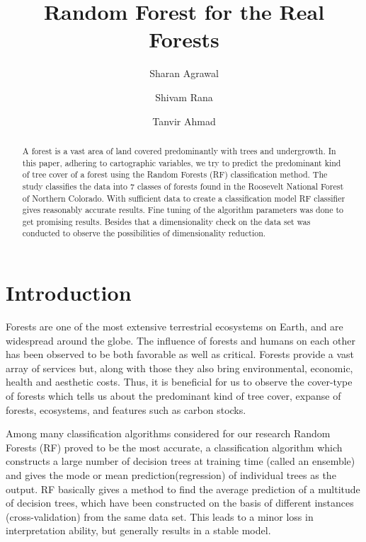\documentclass{llncs}
\begin{document}
\mainmatter
\title{Random Forest for the Real Forests}
\author{Sharan Agrawal \and Shivam Rana \and Tanvir Ahmad}



\maketitle

\begin{abstract}
A forest is a vast area of land covered predominantly with trees and undergrowth. In this paper, adhering to cartographic variables, we try to predict the predominant kind of tree cover of a forest using the Random Forests (RF) classification method. The study classifies the data into 7 classes of forests found in the Roosevelt National Forest of Northern Colorado. With sufficient data to create a classification model RF classifier gives reasonably accurate results. Fine tuning of the algorithm parameters was done to get promising results. Besides that a dimensionality check on the data set was conducted to observe the possibilities of dimensionality reduction.
\end{abstract}


\section{Introduction}

Forests are one of the most extensive terrestrial ecosystems on Earth, and are widespread around the globe. The influence of forests and humans on each other has been observed to be both favorable as well as critical. Forests provide a vast array of services but, along with those they also bring environmental, economic, health and aesthetic costs. Thus, it is beneficial for us to observe the cover-type of forests which tells us about the predominant kind of tree cover, expanse of forests, ecosystems, and features such as carbon stocks.

Among many classification algorithms considered for our research Random Forests (RF) proved to be the most accurate, a classification algorithm which constructs a large number of decision trees at training time (called an ensemble) and gives the mode or mean prediction(regression) of individual trees as the output. RF basically gives a method to find the average prediction of a multitude of decision trees, which have been constructed on the basis of different instances (cross-validation) from the same data set\cite{StatLearn}. This leads to a minor loss in interpretation ability, but generally results in a stable model.
\end{document}
